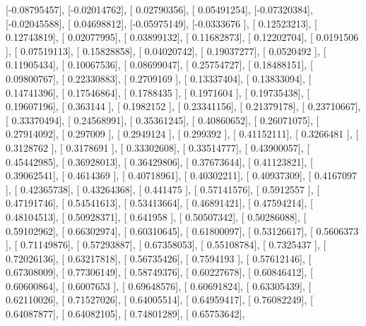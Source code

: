 \documentclass{article}
\begin{document}
       [-0.08795457],
       [-0.02014762],
       [ 0.02790356],
       [ 0.05491254],
       [-0.07320384],
       [-0.02045588],
       [ 0.04698812],
       [-0.05975149],
       [-0.0333676 ],
       [ 0.12523213],
       [ 0.12743819],
       [ 0.02077995],
       [ 0.03899132],
       [ 0.11682873],
       [ 0.12202704],
       [ 0.0191506 ],
       [ 0.07519113],
       [ 0.15828858],
       [ 0.04020742],
       [ 0.19037277],
       [ 0.0520492 ],
       [ 0.11905434],
       [ 0.10067536],
       [ 0.08699047],
       [ 0.25754727],
       [ 0.18488151],
       [ 0.09800767],
       [ 0.22330883],
       [ 0.2709169 ],
       [ 0.13337404],
       [ 0.13833094],
       [ 0.14741396],
       [ 0.17546864],
       [ 0.1788435 ],
       [ 0.1971604 ],
       [ 0.19735438],
       [ 0.19607196],
       [ 0.363144  ],
       [ 0.1982152 ],
       [ 0.23341156],
       [ 0.21379178],
       [ 0.23710667],
       [ 0.33370494],
       [ 0.24568991],
       [ 0.35361245],
       [ 0.40860652],
       [ 0.26071075],
       [ 0.27914092],
       [ 0.297009  ],
       [ 0.2949124 ],
       [ 0.299392  ],
       [ 0.41152111],
       [ 0.3266481 ],
       [ 0.3128762 ],
       [ 0.3178691 ],
       [ 0.33302608],
       [ 0.33514777],
       [ 0.43900057],
       [ 0.45442985],
       [ 0.36928013],
       [ 0.36429806],
       [ 0.37673644],
       [ 0.41123821],
       [ 0.39062541],
       [ 0.4614369 ],
       [ 0.40718961],
       [ 0.40302211],
       [ 0.40937309],
       [ 0.4167097 ],
       [ 0.42365738],
       [ 0.43264368],
       [ 0.441475  ],
       [ 0.57141576],
       [ 0.5912557 ],
       [ 0.47191746],
       [ 0.54541613],
       [ 0.53413664],
       [ 0.46891421],
       [ 0.47594214],
       [ 0.48104513],
       [ 0.50928371],
       [ 0.641958  ],
       [ 0.50507342],
       [ 0.50286088],
       [ 0.59102962],
       [ 0.66302974],
       [ 0.60310645],
       [ 0.61800097],
       [ 0.53126617],
       [ 0.5606373 ],
       [ 0.71149876],
       [ 0.57293887],
       [ 0.67358053],
       [ 0.55108784],
       [ 0.7325437 ],
       [ 0.72026136],
       [ 0.63217818],
       [ 0.56735426],
       [ 0.7594193 ],
       [ 0.57612146],
       [ 0.67308009],
       [ 0.77306149],
       [ 0.58749376],
       [ 0.60227678],
       [ 0.60846412],
       [ 0.60600864],
       [ 0.6007653 ],
       [ 0.69648576],
       [ 0.60691824],
       [ 0.63305439],
       [ 0.62110026],
       [ 0.71527026],
       [ 0.64005514],
       [ 0.64959417],
       [ 0.76082249],
       [ 0.64087877],
       [ 0.64082105],
       [ 0.74801289],
       [ 0.65753642],
\end{document}
